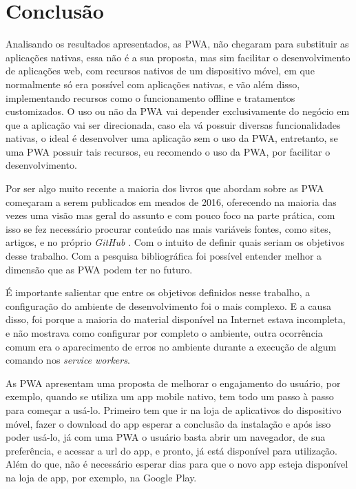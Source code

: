 \chapter{\textbf{Conclusão}}

Analisando os resultados apresentados, as \ac{PWA}, não chegaram para substituir as aplicações nativas, essa não é a sua proposta, mas sim facilitar o desenvolvimento de aplicações web, com recursos nativos de um dispositivo móvel, em que normalmente só era possível com aplicações nativas, e vão além disso, implementando recursos como o funcionamento offline e tratamentos customizados. O uso ou não da \ac{PWA} vai depender exclusivamente do negócio em que a aplicação vai ser direcionada, caso ela vá possuir diversas funcionalidades nativas, o ideal é desenvolver uma aplicação sem o uso da \ac{PWA}, entretanto, se uma \ac{PWA} possuir tais recursos, eu recomendo o uso da \ac{PWA}, por facilitar o desenvolvimento.

Por ser algo muito recente a maioria dos livros que abordam sobre as \ac{PWA}
começaram a serem publicados em meados de 2016, oferecendo na maioria das vezes uma visão
mas geral do assunto e com pouco foco na parte prática, com isso se fez necessário
procurar conteúdo nas mais variáveis fontes, como sites, artigos, e no próprio \textit{GitHub} . Com o intuito
de definir quais seriam os objetivos desse trabalho. Com a pesquisa bibliográfica foi
possível entender melhor a dimensão que as \ac{PWA} podem ter no futuro.

É importante salientar que entre os objetivos definidos nesse trabalho, a configuração do ambiente de
desenvolvimento foi o mais complexo. E a causa disso, foi porque a maioria do material disponível na Internet estava incompleta, e não mostrava como configurar por completo o
ambiente, outra ocorrência comum era o aparecimento de erros no ambiente durante
a execução de algum comando nos \textit{service workers}.


As PWA apresentam uma proposta de melhorar o engajamento do usuário, por exemplo, quando se utiliza um app mobile nativo, tem todo um passo à passo para começar a usá-lo. Primeiro tem que ir na loja de aplicativos do dispositivo móvel, fazer o download do app esperar a conclusão da instalação e após isso poder usá-lo, já com uma \ac{PWA} o usuário basta abrir um navegador, de sua preferência, e acessar a url do app, e pronto, já está disponível para utilização. Além do que, não é necessário 
esperar dias para que o novo app esteja disponível na loja de app, por exemplo, na Google Play.


